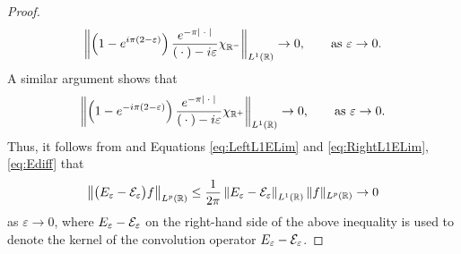 \documentclass[../dissertation.tex]{subfiles}
\begin{document}
\begin{proof}
\begin{align}
		\left\| \left( 1 - e^{i \pi (2-\varepsilon)}\right) 
			\frac{e^{-\pi|\kern 0.5ex \cdot \kern 0.5ex|}}{(\kern 0.5ex \cdot \kern 0.5ex) - i\varepsilon} \chi_{\mathbb R^-} 
		\right\|_{L^1(\mathbb R)}
			\to 0, 
			\qquad \text{as } \varepsilon \to 0. 
	\end{align}
	A similar argument shows that 
	\begin{align}\label{eq:RightL1ELim}
		\left\| \left( 1 - e^{-i \pi (2-\varepsilon)}\right) 
			\frac{e^{-\pi|\kern 0.5ex \cdot \kern 0.5ex|}}{(\kern 0.5ex \cdot \kern 0.5ex) - i\varepsilon} \chi_{\mathbb R^+} 
		\right\|_{L^1(\mathbb R)}
			\to 0, 
			\qquad \text{as } \varepsilon \to 0. 
	\end{align}
	Thus, it follows from \cite[Theorem 1.2.10]{Grafakos} and 
	Equations \eqref{eq:LeftL1ELim} and \eqref{eq:RightL1ELim},
	\eqref{eq:Ediff} that
	\begin{align*}
		\left\|\big(E_\varepsilon-\mathcal E_\varepsilon\big) f \right\|_{L^p(\mathbb R)}
			\leq \frac{1}{2\pi} 
					\left\|E_\varepsilon-\mathcal E_\varepsilon\right\|_{L^1(\mathbb R)}
					\|f\|_{L^p(\mathbb R)}
			\to 0
	\end{align*}
	as $\varepsilon \to 0$, where $E_\varepsilon-\mathcal E_\varepsilon$ on the right-hand
	side of the above inequality is used to denote the kernel of the convolution
	operator $E_\varepsilon-\mathcal E_\varepsilon$.



\end{proof}
\end{document}
